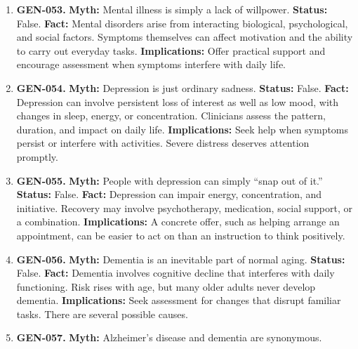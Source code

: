 \documentclass[11pt,oneside]{book}
\begin{document}
\begin{enumerate}[leftmargin=0pt,labelwidth=0pt,labelsep=0pt,itemindent=0pt]
\textbf{Implications:} For a detail that matters, check a contemporaneous record when one is available.
\item[] \textbf{GEN-053.} \textbf{Myth:} Mental illness is simply a lack of willpower.\newline
\textbf{Status:} False.\newline
\textbf{Fact:} Mental disorders arise from interacting biological, psychological, and social factors. Symptoms themselves can affect motivation and the ability to carry out everyday tasks. \cite{ref190}\newline
\textbf{Implications:} Offer practical support and encourage assessment when symptoms interfere with daily life.
\item[] \textbf{GEN-054.} \textbf{Myth:} Depression is just ordinary sadness.\newline
\textbf{Status:} False.\newline
\textbf{Fact:} Depression can involve persistent loss of interest as well as low mood, with changes in sleep, energy, or concentration. Clinicians assess the pattern, duration, and impact on daily life. \cite{ref63}\newline
\textbf{Implications:} Seek help when symptoms persist or interfere with activities. Severe distress deserves attention promptly.
\item[] \textbf{GEN-055.} \textbf{Myth:} People with depression can simply ``snap out of it.''\newline
\textbf{Status:} False.\newline
\textbf{Fact:} Depression can impair energy, concentration, and initiative. Recovery may involve psychotherapy, medication, social support, or a combination. \cite{ref63}\newline
\textbf{Implications:} A concrete offer, such as helping arrange an appointment, can be easier to act on than an instruction to think positively.
\item[] \textbf{GEN-056.} \textbf{Myth:} Dementia is an inevitable part of normal aging.\newline
\textbf{Status:} False.\newline
\textbf{Fact:} Dementia involves cognitive decline that interferes with daily functioning. Risk rises with age, but many older adults never develop dementia. \cite{ref249}\newline
\textbf{Implications:} Seek assessment for changes that disrupt familiar tasks. There are several possible causes.
\item[] \textbf{GEN-057.} \textbf{Myth:} Alzheimer's disease and dementia are synonymous.\newline

\end{enumerate}
\end{document}
